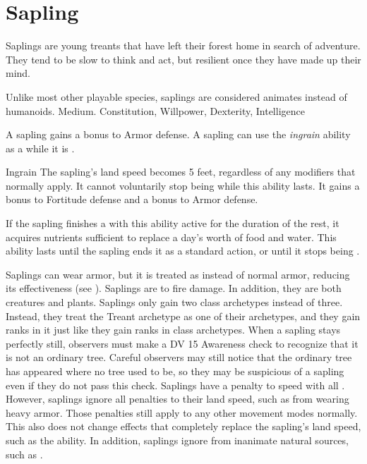 \section{Sapling}

    Saplings are young treants that have left their forest home in search of adventure.
    They tend to be slow to think and act, but resilient once they have made up their mind.

     Unlike most other playable species, saplings are considered animates instead of humanoids.
     Medium.
      Constitution,  Willpower,  Dexterity,  Intelligence
    \begin{itemize}
         A sapling gains a  bonus to Armor defense.
         A sapling can use the \textit{ingrain} ability as a  while it is .
            \begin{activeability}{Ingrain}
                \rankline
                The sapling's land speed becomes 5 feet, regardless of any modifiers that normally apply.
                It cannot voluntarily stop being  while this ability lasts.
                It gains a  bonus to Fortitude defense and a  bonus to Armor defense.

                If the sapling finishes a  with this ability active for the duration of the rest, it acquires nutrients sufficient to replace a day's worth of food and water.
                This ability lasts until the sapling ends it as a standard action, or until it stops being .
            \end{activeability}
         Saplings can wear armor, but it is treated as  instead of normal armor, reducing its effectiveness (see ).
         Saplings are \vulnerable to fire damage. In addition, they are both creatures and plants.
         Saplings only gain two class archetypes instead of three.
            Instead, they treat the Treant archetype as one of their archetypes, and they gain ranks in it just like they gain ranks in class archetypes.
         When a sapling stays perfectly still, observers must make a DV 15 Awareness check to recognize that it is not an ordinary tree.
        Careful observers may still notice that the ordinary tree has appeared where no tree used to be, so they may be suspicious of a sapling even if they do not pass this check.
         Saplings have a  penalty to speed with all .
            However, saplings ignore all penalties to their land speed, such as from wearing heavy armor.
            Those penalties still apply to any other movement modes normally.
            This also does not change effects that completely replace the sapling's land speed, such as the  ability.
            In addition, saplings ignore  from inanimate natural sources, such as .
    \end{itemize}
